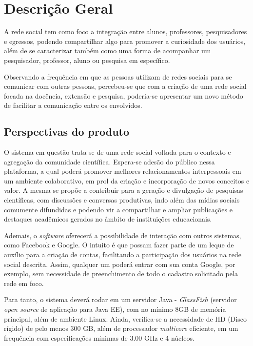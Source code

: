 \chapter{Descrição Geral}
A rede social tem como foco a integração entre alunos, professores, pesquisadores e egressos, podendo compartilhar algo para promover a curiosidade dos usuários, além de se caracterizar também como uma forma de acompanhar um pesquisador, professor, aluno ou pesquisa em específico. 	

Observando a frequência em que as pessoas utilizam de redes sociais para se comunicar com outras pessoas, percebeu-se que com a criação de uma rede social focada na docência, extensão e pesquisa, poderia-se apresentar um novo método de facilitar a comunicação entre os envolvidos. 


\section{Perspectivas do produto}

O sistema em questão trata-se de uma rede social voltada para o contexto e agregação da comunidade científica. Espera-se adesão do público nessa plataforma, a qual poderá promover melhores relacionamentos interpessoais em um ambiente colaborativo, em prol da criação e incorporação de novos conceitos e valor. A mesma se propõe a contribuir para a geração e divulgação de pesquisas científicas, com discussões e conversas produtivas, indo além das mídias sociais comumente difundidas e podendo vir a compartilhar e ampliar publicações e destaques acadêmicos gerados no âmbito de instituições educacionais.

Ademais, o \textit{software} oferecerá a possibilidade de interação com outros sistemas, como Facebook e Google. O intuito é que possam fazer parte de um leque de auxílio para a criação de contas, facilitando a participação dos usuários na rede social descrita. Assim, qualquer um poderá entrar com sua conta Google, por exemplo, sem necessidade de preenchimento de todo o cadastro solicitado pela rede em foco.

Para tanto, o sistema deverá rodar em um servidor Java - \textit{GlassFish} (servidor \textit{open source} de aplicação para Java EE), com no mínimo 8GB de memória principal, além de ambiente Linux. Ainda, verifica-se a necessidade de HD (Disco rígido) de pelo menos 300 GB, além de processador \textit{multicore} eficiente, em um frequência com especificações mínimas de 3.00 GHz e 4 núcleos. 


